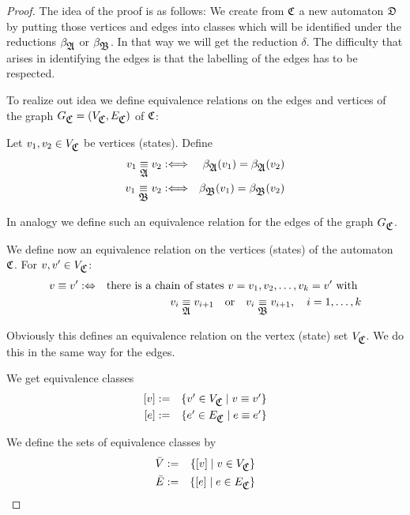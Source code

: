 \begin{proof}
The idea of the proof is as follows: We create from $\mbox{$\mathfrak{C}$}$ a
new automaton $\mbox{$\mathfrak{D}$}$ by putting those vertices and edges into classes which will
be identified under the reductions $\beta_{\mbox{$\mathfrak{A}$}}$ or $\beta_{\mbox{$\mathfrak{B}$}}$. In that
way we will get the reduction $\delta$. The difficulty that arises in
identifying the edges is that the labelling of the edges has to be respected.

To realize out idea we define equivalence relations on the edges and vertices of
the graph $G_{\mbox{$\mathfrak{C}$}} = (V_{\mbox{$\mathfrak{C}$}}, E_{\mbox{$\mathfrak{C}$}})$ of $\mbox{$\mathfrak{C}$}$:

Let $v_1, v_2 \in V_{\mbox{$\mathfrak{C}$}}$ be vertices (states). Define
\begin{eqnarray*}
v_1 \underset{\mbox{$\mathfrak{A}$}}{\equiv} v_2 & : \Longleftrightarrow & \beta_{\mbox{$\mathfrak{A}$}}(v_1) =
\beta_{\mbox{$\mathfrak{A}$}}(v_2) \\
v_1 \underset{\mbox{$\mathfrak{B}$}}{\equiv} v_2 & : \Longleftrightarrow & \beta_{\mbox{$\mathfrak{B}$}}(v_1) =
\beta_{\mbox{$\mathfrak{B}$}}(v_2)
\end{eqnarray*}

In analogy we define such an equivalence relation for the edges of the graph
$G_{\mbox{$\mathfrak{C}$}}$.

We define now an equivalence relation on the vertices (states) of the automaton
$\mbox{$\mathfrak{C}$}$. For $v, v' \in V_{\mbox{$\mathfrak{C}$}}$:
\begin{eqnarray*}
v \equiv v' & :\Leftrightarrow & \mbox{there is a chain of states } v = v_1,
v_2, \ldots, v_k = v'\mbox{ with } \\
& & v_i \underset{\mbox{$\mathfrak{A}$}}{\equiv} v_{i+1}\mbox{\quad or\quad }v_i \underset{\mbox{$\mathfrak{B}$}}{\equiv} v_{i+1},\quad i
= 1, \ldots, k
\end{eqnarray*} 

Obviously this defines an equivalence relation on the vertex (state) set
$V_{\mbox{$\mathfrak{C}$}}$. We do this in the same way for the edges.

We get equivalence classes
\begin{eqnarray*}
\left[ v \right] & := & \mbox{$\{v' \in V_{\mbox{$\mathfrak{C}$}} \mid v \equiv v'\}$} \\
\left[ e \right] & := & \mbox{$\{e' \in E_{\mbox{$\mathfrak{C}$}} \mid e \equiv e'\}$}
\end{eqnarray*}

We define the sets of equivalence classes by
\begin{eqnarray*}
\bar{V} & := & \mbox{$\{[v] \mid v \in V_{\mbox{$\mathfrak{C}$}}\}$} \\ 
\bar{E} & := & \mbox{$\{[e] \mid e \in E_{\mbox{$\mathfrak{C}$}}\}$} 
\end{eqnarray*}


\end{proof}

